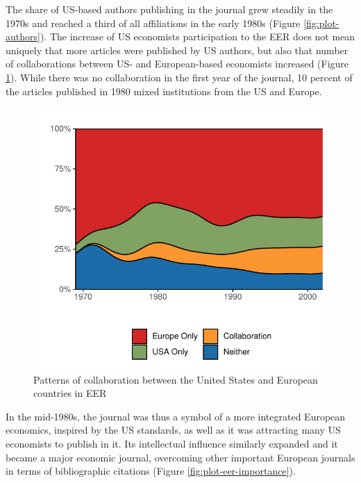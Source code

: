 \documentclass[]{elsarticle} %
\begin{document}
The share of US-based authors publishing in the journal grew steadily in
the 1970s and reached a third of all affiliations in the early 1980s
(Figure \ref{fig:plot-authors}). The increase of US economists
participation to the EER does not mean uniquely that more articles were
published by US authors, but also that number of collaborations between
US- and European-based economists increased (Figure
\ref{fig:plot-collabs}). While there was no collaboration in the first
year of the journal, 10 percent of the articles published in 1980 mixed
institutions from the US and Europe.

\begin{figure}[h]

{\centering \includegraphics{First_version_files/figure-latex/plot-collabs-1} 

}

\caption{Patterns of collaboration between the United States and European countries in EER}\label{fig:plot-collabs}
\end{figure}

In the mid-1980s, the journal was thus a symbol of a more integrated
European economics, inspired by the US standards, as well as it was
attracting many US economists to publish in it. Its intellectual
influence similarly expanded and it became a major economic journal,
overcoming other important European journals in terms of bibliographic
citations (Figure \ref{fig:plot-eer-importance}).
\end{document}
